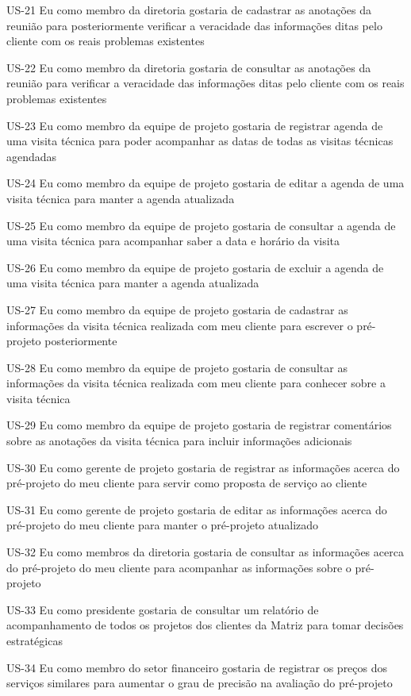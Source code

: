 US-21 Eu como membro da diretoria gostaria de cadastrar as anotações da reunião para posteriormente verificar a veracidade das informações ditas pelo cliente com os reais problemas existentes


US-22 Eu como membro da diretoria gostaria de consultar as anotações da reunião para verificar a veracidade das informações ditas pelo cliente com os reais problemas existentes


US-23 Eu como membro da equipe de projeto gostaria de registrar agenda de uma visita técnica para poder acompanhar as datas de todas as visitas técnicas agendadas


US-24 Eu como membro da equipe de projeto gostaria de editar a agenda de uma visita técnica para manter a agenda atualizada


US-25 Eu como membro da equipe de projeto gostaria de consultar a agenda de uma visita técnica para acompanhar saber a data e horário da visita


US-26 Eu como membro da equipe de projeto gostaria de excluir a agenda de uma visita técnica para manter a agenda atualizada


US-27 Eu como membro da equipe de projeto gostaria de cadastrar as informações da visita técnica realizada com meu cliente para escrever o pré-projeto posteriormente


US-28 Eu como membro da equipe de projeto gostaria de consultar as informações da visita técnica realizada com meu cliente para conhecer sobre a visita técnica


US-29 Eu como membro da equipe de projeto gostaria de registrar comentários sobre as anotações da visita técnica para incluir informações adicionais


US-30 Eu como gerente de projeto gostaria de registrar as informações acerca do pré-projeto do meu cliente para servir como proposta de serviço ao cliente


US-31 Eu como gerente de projeto gostaria de editar as informações acerca do pré-projeto do meu cliente para manter o pré-projeto atualizado


US-32 Eu como membros da diretoria gostaria de consultar as informações acerca do pré-projeto do meu cliente para acompanhar as informações sobre o pré-projeto


US-33 Eu como presidente gostaria de consultar um relatório de acompanhamento de todos os projetos dos clientes da Matriz para tomar decisões estratégicas


US-34 Eu como membro do setor financeiro gostaria de registrar os preços dos serviços similares para aumentar o grau de precisão na avaliação do pré-projeto


